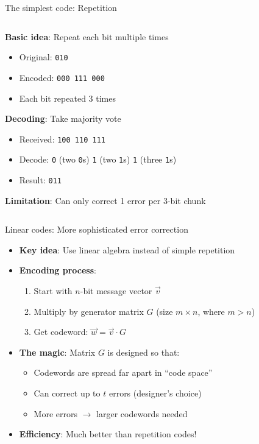 \documentclass[aspectratio=169, lualatex, handout]{beamer}
\begin{document}
\begin{frame}{The simplest code: Repetition}
	\begin{columns}[c]
		\begin{column}{1\textwidth}
			\textbf{Basic idea}: Repeat each bit multiple times
			\begin{itemize}
				\item Original: \texttt{010}
				\item Encoded: \texttt{000 111 000}
				\item Each bit repeated 3 times
			\end{itemize}

			\textbf{Decoding}: Take majority vote
			\begin{itemize}
				\item Received: \texttt{100 110 111}
				\item Decode: \texttt{0} (two \texttt{0}s) \texttt{1} (two \texttt{1}s) \texttt{1} (three \texttt{1}s)
				\item Result: \texttt{011}
			\end{itemize}

			\textbf{Limitation}: Can only correct 1 error per 3-bit chunk
		\end{column}
	\end{columns}
\end{frame}

\begin{frame}{Linear codes: More sophisticated error correction}
	\begin{itemize}
		\item \textbf{Key idea}: Use linear algebra instead of simple repetition
		\item \textbf{Encoding process}:
		      \begin{enumerate}
			      \item Start with $n$-bit message vector $\vec{v}$
			      \item Multiply by generator matrix $G$ (size $m \times n$, where $m > n$)
			      \item Get codeword: $\vec{w} = \vec{v} \cdot G$
		      \end{enumerate}
		\item \textbf{The magic}: Matrix $G$ is designed so that:
		      \begin{itemize}
			      \item Codewords are spread far apart in ``code space''
			      \item Can correct up to $t$ errors (designer's choice)
			      \item More errors $\rightarrow$ larger codewords needed
		      \end{itemize}
		\item \textbf{Efficiency}: Much better than repetition codes!
	\end{itemize}
\end{frame}
\end{document}
